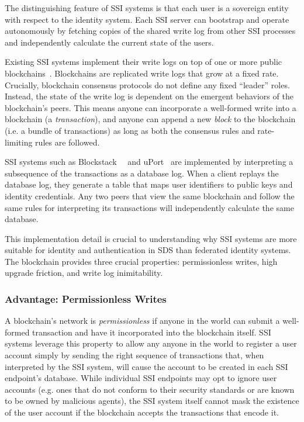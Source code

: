 The distinguishing feature of SSI systems is that each user is a sovereign
entity with respect to the identity system.  Each SSI server can
bootstrap and operate autonomously by fetching copies
of the shared write log from other SSI processes and independently
calculate the current state of the users.

Existing SSI systems implement their write logs on top of one or more public
blockchains~\cite{bitcoin}.  Blockchains are replicated write logs that
grow at a fixed rate.  Crucially, blockchain consensus protocols do not 
define any fixed ``leader'' roles.  Instead, the state of the write log is dependent on the emergent behaviors
of the blockchain's peers.  This means anyone can incorporate a well-formed write into a blockchain
(a \emph{transaction}), and anyone can append a new \emph{block} to the
blockchain (i.e. a bundle of transactions)
as long as both the consensus rules and rate-limiting rules are followed.

SSI systems such as Blockstack~\cite{blockstack}~\cite{blockstack-thesis} and
uPort~\cite{uport} are implemented by interpreting a subsequence of the
transactions as a database log.  When a client replays the database log, they
generate a table that maps user identifiers to public keys and identity
credentials.  Any two peers that view the same blockchain and follow the
same rules for interpreting its transactions will independently
calculate the same database.

This implementation detail is crucial to understanding why SSI systems are
more suitable for identity and authentication in SDS than federated identity
systems.  The blockchain provides three crucial properties:  permissionless
writes, high upgrade friction, and write log inimitability.

\subsubsection{Advantage: Permissionless Writes}

A blockchain's network is \emph{permissionless} if anyone in the world can submit a
well-formed transaction and have it incorporated into the blockchain itself.
SSI systems leverage this property to allow any anyone in the world to register a user account
simply by sending the right sequence of transactions that, when interpreted by the SSI system, will
cause the account to be created in each SSI endpoint's database.
While individual SSI endpoints may opt to ignore user accounts (e.g. ones that do not conform to their security
standards or are known to be owned by malicious agents), the SSI system itself cannot
mask the existence of the user account if the blockchain accepts the
transactions that encode it.

